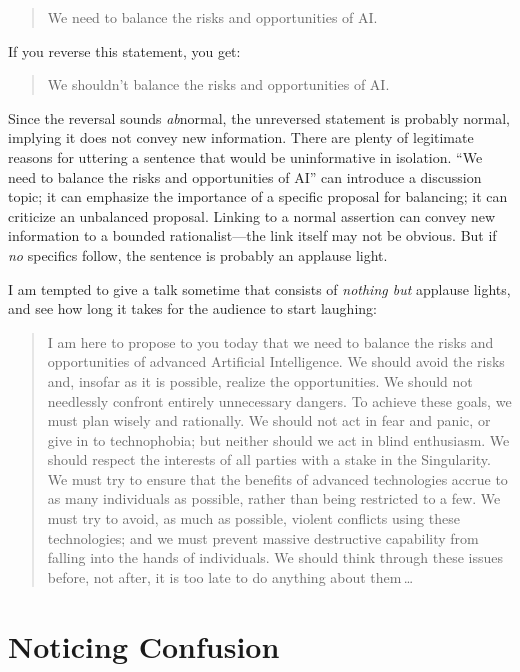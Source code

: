 \begin{quote}
{
  We need to balance the risks and opportunities of AI.}
\end{quote}

{
 If you reverse this statement, you get:}

\begin{quote}
{
 We shouldn't balance the risks and opportunities
 of AI.}
\end{quote}

{
 Since the reversal sounds \textit{ab}normal, the unreversed
statement is probably normal, implying it does not convey new
information. There are plenty of legitimate reasons for uttering a
sentence that would be uninformative in isolation.
``We need to balance the risks and opportunities of
AI'' can introduce a discussion topic; it can
emphasize the importance of a specific proposal for balancing; it can
criticize an unbalanced proposal. Linking to a normal assertion can
convey new information to a bounded rationalist---the link itself may
not be obvious. But if \textit{no} specifics follow, the sentence is
probably an applause light.}

{
 I am tempted to give a talk sometime that consists of
\textit{nothing but} applause lights, and see how long it takes for the
audience to start laughing:}

\begin{quote}
{
 I am here to propose to you today that we need to balance the
risks and opportunities of advanced Artificial Intelligence. We should
avoid the risks and, insofar as it is possible, realize the
opportunities. We should not needlessly confront entirely unnecessary
dangers. To achieve these goals, we must plan wisely and rationally. We
should not act in fear and panic, or give in to technophobia; but
neither should we act in blind enthusiasm. We should respect the
interests of all parties with a stake in the Singularity. We must try
to ensure that the benefits of advanced technologies accrue to as many
individuals as possible, rather than being restricted to a few. We must
try to avoid, as much as possible, violent conflicts using these
technologies; and we must prevent massive destructive capability from
falling into the hands of individuals. We should think through these
issues before, not after, it is too late to do anything about them\,\ldots}
\end{quote}

\myendsectiontext

\chapter{Noticing Confusion}


